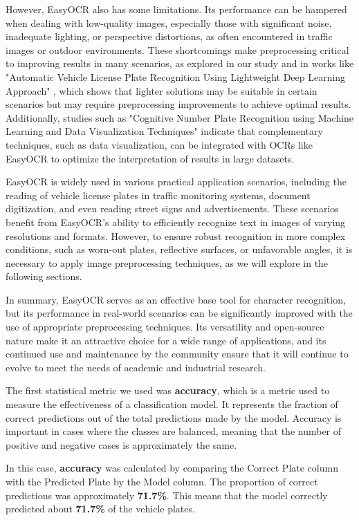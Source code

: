 \documentclass[conference]{IEEEtran}
\begin{document}
	However, EasyOCR also has some limitations. Its performance can be hampered when dealing with low-quality images, especially those with significant noise, inadequate lighting, or perspective distortions, as often encountered in traffic images or outdoor environments. These shortcomings make preprocessing critical to improving results in many scenarios, as explored in our study and in works like "Automatic Vehicle License Plate Recognition Using Lightweight Deep Learning Approach" \cite{b5}, which shows that lighter solutions may be suitable in certain scenarios but may require preprocessing improvements to achieve optimal results. Additionally, studies such as "Cognitive Number Plate Recognition using Machine Learning and Data Visualization Techniques" \cite{b6} indicate that complementary techniques, such as data visualization, can be integrated with OCRs like EasyOCR to optimize the interpretation of results in large datasets.
	
	EasyOCR is widely used in various practical application scenarios, including the reading of vehicle license plates in traffic monitoring systems, document digitization, and even reading street signs and advertisements. These scenarios benefit from EasyOCR's ability to efficiently recognize text in images of varying resolutions and formats. However, to ensure robust recognition in more complex conditions, such as worn-out plates, reflective surfaces, or unfavorable angles, it is necessary to apply image preprocessing techniques, as we will explore in the following sections.
	
	In summary, EasyOCR serves as an effective base tool for character recognition, but its performance in real-world scenarios can be significantly improved with the use of appropriate preprocessing techniques. Its versatility and open-source nature make it an attractive choice for a wide range of applications, and its continued use and maintenance by the community ensure that it will continue to evolve to meet the needs of academic and industrial research.
	
	The first statistical metric we used was \textbf{accuracy}, which is a metric used to measure the effectiveness of a classification model. It represents the fraction of correct predictions out of the total predictions made by the model. Accuracy is important in cases where the classes are balanced, meaning that the number of positive and negative cases is approximately the same.
	
	In this case, \textbf{accuracy} was calculated by comparing the Correct Plate column with the Predicted Plate by the Model column. The proportion of correct predictions was approximately \textbf{71.7\%}. This means that the model correctly predicted about \textbf{71.7\%} of the vehicle plates.
	
\end{document}
